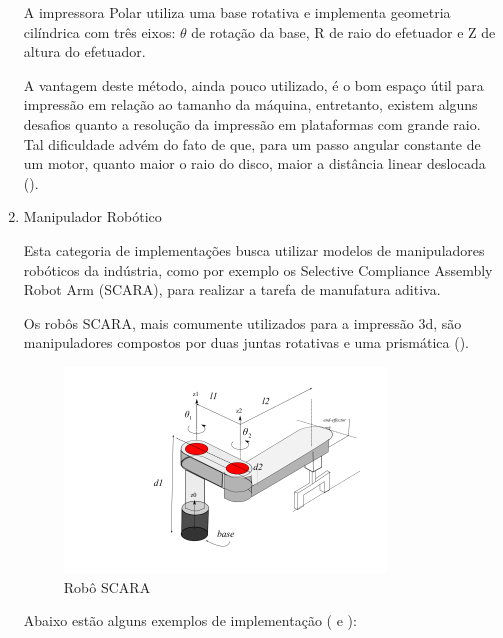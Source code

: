 \documentclass[12pt, english]{article}
\begin{document}
\begin{enumerate}[leftmargin=*, listparindent=0.7cm]
{		A impressora Polar utiliza uma base rotativa e implementa geometria cilíndrica com três eixos: $\theta$ de rotação da base, R de raio do efetuador e Z de altura do efetuador. 

		A vantagem deste método, ainda pouco utilizado, é o bom espaço útil para impressão em relação ao tamanho da máquina, entretanto, existem alguns desafios quanto a resolução da impressão em plataformas com grande raio. Tal dificuldade advém do fato de que, para um passo angular constante de um motor, quanto maior o raio do disco, maior a distância linear deslocada (\cite{Deshpande2019}). 
	}
	\item {
		Manipulador Robótico

		Esta categoria de implementações busca utilizar modelos de manipuladores robóticos da indústria, como por exemplo os Selective Compliance Assembly Robot Arm (SCARA), para realizar a tarefa de manufatura aditiva. 

		Os robôs SCARA, mais comumente utilizados para a impressão 3d, são manipuladores compostos por duas juntas rotativas e uma prismática (\cite{Koo2019}). 

		\begin{figure}[H]
			\centering
			\includegraphics[height=.4\linewidth]{SCARA.png}
			\caption{Robô SCARA}
		\end{figure} 
		
		Abaixo estão alguns exemplos de implementação (\cite{ALL3DP:SCARA3DPrinter} e \cite{POTTERSCARA}):

}
\end{enumerate}
\end{document}
